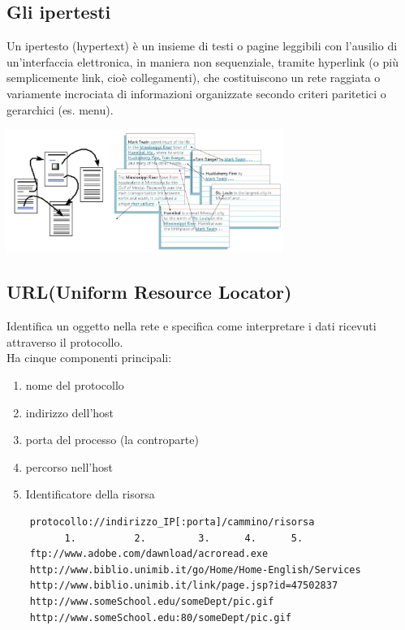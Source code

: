 \subsection{Gli ipertesti}
Un ipertesto (hypertext) è un insieme di testi o pagine leggibili con l'ausilio di un'interfaccia elettronica, in maniera non sequenziale, tramite hyperlink (o più semplicemente link, cioè collegamenti), che costituiscono un rete raggiata o variamente incrociata di informazioni organizzate secondo criteri paritetici o gerarchici (es. menu).
\begin{center}
    \includegraphics[width=0.675\textwidth]{img/MOC_architetture2.jpg}
\end{center}

\subsection{URL(Uniform Resource Locator)}
Identifica un oggetto nella rete e specifica come interpretare i dati ricevuti attraverso il protocollo.
\\Ha cinque componenti principali:
\begin{enumerate}
    \item nome del protocollo
    \item indirizzo dell'host
    \item porta del processo (la controparte)
    \item percorso nell'host
    \item Identificatore della risorsa
\end{enumerate}
\begin{verbatim}
    protocollo://indirizzo_IP[:porta]/cammino/risorsa
          1.          2.         3.      4.      5.
    ftp://www.adobe.com/dawnload/acroread.exe
    http://www.biblio.unimib.it/go/Home/Home-English/Services
    http://www.biblio.unimib.it/link/page.jsp?id=47502837
    http://www.someSchool.edu/someDept/pic.gif
    http://www.someSchool.edu:80/someDept/pic.gif
\end{verbatim}

